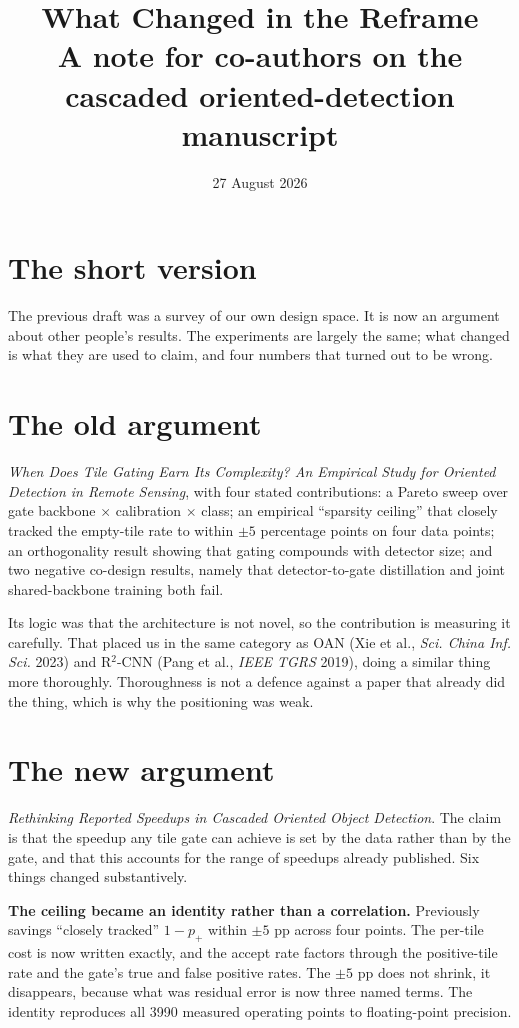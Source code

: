 \documentclass[11pt,a4paper]{article}
\title{What Changed in the Reframe\\[2pt]
\large A note for co-authors on the cascaded oriented-detection manuscript}
\author{}
\date{27 August 2026}
\begin{document}
\maketitle
\vspace{-2.2em}

\section*{The short version}

The previous draft was a survey of our own design space. It is now an argument
about other people's results. The experiments are largely the same; what changed
is what they are used to claim, and four numbers that turned out to be wrong.

\section*{The old argument}

\textit{When Does Tile Gating Earn Its Complexity? An Empirical Study for
Oriented Detection in Remote Sensing}, with four stated contributions: a Pareto
sweep over gate backbone $\times$ calibration $\times$ class; an empirical
``sparsity ceiling'' that closely tracked the empty-tile rate to within
$\pm 5$ percentage points on four data points; an orthogonality result showing
that gating compounds with detector size; and two negative co-design results,
namely that detector-to-gate distillation and joint shared-backbone training both
fail.

Its logic was that the architecture is not novel, so the contribution is
measuring it carefully. That placed us in the same category as OAN
(Xie et al., \textit{Sci. China Inf. Sci.} 2023) and R$^2$-CNN (Pang et al.,
\textit{IEEE TGRS} 2019), doing a similar thing more thoroughly. Thoroughness is
not a defence against a paper that already did the thing, which is why the
positioning was weak.

\section*{The new argument}

\textit{Rethinking Reported Speedups in Cascaded Oriented Object Detection}. The
claim is that the speedup any tile gate can achieve is set by the data rather
than by the gate, and that this accounts for the range of speedups already
published. Six things changed substantively.

\textbf{The ceiling became an identity rather than a correlation.} Previously
savings ``closely tracked'' $1 - p_+$ within $\pm 5$ pp across four points. The
per-tile cost is now written exactly, and the accept rate factors through the
positive-tile rate and the gate's true and false positive rates. The $\pm 5$ pp
does not shrink, it disappears, because what was residual error is now three
named terms. The identity reproduces all 3990 measured operating points to
floating-point precision.
\end{document}
